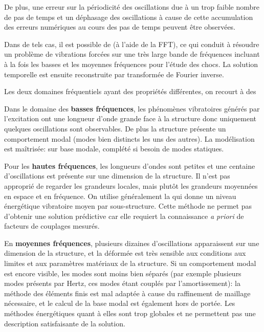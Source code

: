\medskip
{}
De plus, une erreur sur la périodicité des oscillations due à un trop faible nombre de pas de temps et un déphasage des oscillations à cause de cette accumulation des erreurs numériques au cours des pas de temps peuvent être observées.

Dans de tels cas, il est possible de  (à l'aide de la FFT), ce qui conduit à résoudre un problème de vibrations forcées sur une très large bande de fréquences incluant à la fois les basses et les moyennes fréquences pour l'étude des chocs. La solution temporelle est ensuite reconstruite par transformée de Fourier inverse.

Les deux domaines fréquentiels ayant des propriétés différentes, on recourt à des 

\medskip
Dans le domaine des \textbf{basses fréquences}, les phénomènes vibratoires générés par l'excitation ont une longueur
d'onde grande face à la structure donc uniquement quelques oscillations sont observables. De plus
la structure présente un comportement modal (modes bien distincts les uns des autres).
La modélisation est maîtrisée:  sur base modale, complété si besoin de modes
statiques.

\medskip
Pour les \textbf{hautes fréquences}, les longueurs d'ondes sont petites et une centaine d'oscillations est présente sur une dimension de la structure. Il n'est pas approprié de regarder les grandeurs locales, mais plutôt les grandeurs moyennées en espace et en fréquence. On utilise généralement la   qui donne un niveau énergétique vibratoire moyen par sous-structure. Cette méthode ne permet pas d'obtenir une solution prédictive car elle requiert la connaissance \emph{a priori} de facteurs de
couplages mesurés.

\medskip
En \textbf{moyennes fréquences}, plusieurs dizaines d'oscillations apparaissent sur une dimension de la structure, et la déformée est très sensible aux conditions aux limites et aux paramètres matériaux de la structure. Si un comportement modal est encore visible, les modes sont moins bien séparés (par exemple plusieurs modes présents par Hertz, ces modes étant couplés par l'amortissement): la méthode des éléments finis est mal adaptée à cause du raffinement de maillage nécessaire, et le calcul de la base modal est également hors de portée. Les méthodes énergétiques quant à elles sont trop globales et ne permettent pas une description satisfaisante de la solution.

